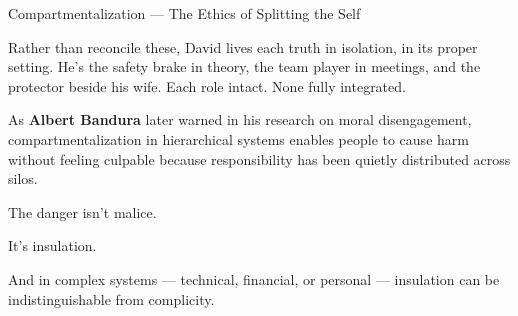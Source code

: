 \begin{PsychologicalSidebar}{Compartmentalization --- The Ethics of Splitting the Self}
\medskip

Rather than reconcile these, David lives each truth in isolation, in its proper setting. He’s the safety 
brake in theory, the team player in meetings, and the protector beside his wife. Each role intact. None 
fully integrated.

\medskip

As \textbf{Albert Bandura} later warned in his research on moral disengagement, compartmentalization 
in hierarchical systems enables people to cause harm without feeling culpable because responsibility has 
been quietly distributed across silos.

\medskip

The danger isn’t malice.

\medskip

It’s insulation.

\medskip

And in complex systems --- technical, financial, or personal --- insulation can be indistinguishable from 
complicity.

\end{PsychologicalSidebar}
